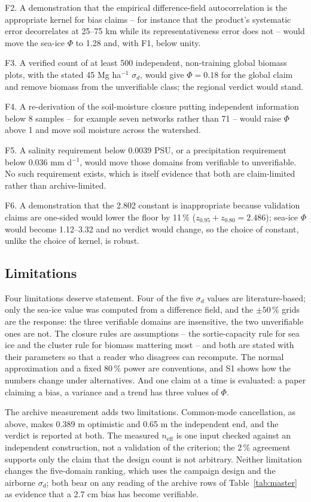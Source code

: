 \documentclass[preprint,12pt,authoryear]{elsarticle}
\begin{document}
F2. A demonstration that the empirical difference-field autocorrelation is the appropriate kernel for bias claims -- for instance that the product's systematic error decorrelates at 25--75 km while its representativeness error does not -- would move the sea-ice $\Phi$ to 1.28 and, with F1, below unity.

F3. A verified count of at least 500 independent, non-training global biomass plots, with the stated 45 Mg ha$^{-1}$ $\sigma_d$, would give $\Phi = 0.18$ for the global claim and remove biomass from the unverifiable class; the regional verdict would stand.

F4. A re-derivation of the soil-moisture closure putting independent information below 8 samples -- for example seven networks rather than 71 -- would raise $\Phi$ above 1 and move soil moisture across the watershed.

F5. A salinity requirement below 0.0039 PSU, or a precipitation requirement below 0.036 mm d$^{-1}$, would move those domains from verifiable to unverifiable. No such requirement exists, which is itself evidence that both are claim-limited rather than archive-limited.

F6. A demonstration that the 2.802 constant is inappropriate because validation claims are one-sided would lower the floor by 11\,\% ($z_{0.95}+z_{0.80} = 2.486$); sea-ice $\Phi$ would become 1.12--3.32 and no verdict would change, so the choice of constant, unlike the choice of kernel, is robust.

\subsection{Limitations}

Four limitations deserve statement. Four of the five $\sigma_d$ values are literature-based; only the sea-ice value was computed from a difference field, and the $\pm 50\,\%$ grids are the response: the three verifiable domains are insensitive, the two unverifiable ones are not. The closure rules are assumptions -- the sortie-capacity rule for sea ice and the cluster rule for biomass mattering most -- and both are stated with their parameters so that a reader who disagrees can recompute. The normal approximation and a fixed 80\,\% power are conventions, and S1 shows how the numbers change under alternatives. And one claim at a time is evaluated: a paper claiming a bias, a variance and a trend has three values of $\Phi$.

The archive measurement adds two limitations. Common-mode cancellation, as above, makes 0.389 m optimistic and 0.65 m the independent end, and the verdict is reported at both. The measured $n_{\mathrm{eff}}$ is one input checked against an independent construction, not a validation of the criterion; the 2\,\% agreement supports only the claim that the design count is not arbitrary. Neither limitation changes the five-domain ranking, which uses the campaign design and the airborne $\sigma_d$; both bear on any reading of the archive rows of Table~\ref{tab:master} as evidence that a 2.7 cm bias has become verifiable.
\end{document}
